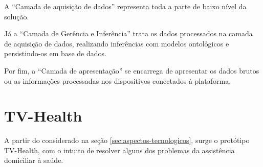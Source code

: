 

A ``Camada de aquisição de dados'' representa toda a parte de baixo nível da
solução.

Já a ``Camada de Gerência e Inferência'' trata os dados processados na camada
de aquisição de dados, realizando inferências com modelos ontológicos e 
persistindo-os em base de dados.

Por fim, a ``Camada de apresentação'' se encarrega de apresentar os dados brutos
ou as informações processadas nos dispositivos conectados à plataforma.

\section{TV-Health} \label{sec:tv-health} 

A partir do considerado na seção \ref{sec:aspectos-tecnologicos}, surge o
protótipo TV-Health, com o intuito de resolver alguns dos problemas da
assistência domiciliar à saúde.





